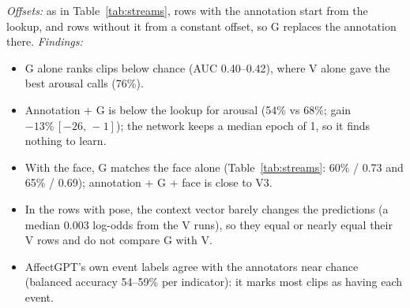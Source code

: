 \documentclass[11pt]{article}
\newcommand{\ci}[2]{\,[#1,\,#2]}
\begin{document}
\begin{table}[!htbp]
{\emph{Offsets:} as in Table~\ref{tab:streams}, rows with the annotation start from the lookup, and rows without it from a constant offset, so G replaces the annotation there.
\emph{Findings:}
\begin{itemize}
  \item G alone ranks clips below chance (AUC 0.40--0.42), where V alone gave the best arousal calls (76\%).
  \item Annotation + G is below the lookup for arousal (54\% vs 68\%; gain $-13\%\ci{-26}{-1}$); the network keeps a median epoch of 1, so it finds nothing to learn.
  \item With the face, G matches the face alone (Table~\ref{tab:streams}: 60\% / 0.73 and 65\% / 0.69); annotation + G + face is close to V3.
  \item In the rows with pose, the context vector barely changes the predictions (a median 0.003 log-odds from the V runs), so they equal or nearly equal their V rows and do not compare G with V.
  \item AffectGPT's own event labels agree with the annotators near chance (balanced accuracy 54--59\% per indicator): it marks most clips as having each event.
\end{itemize}}
\end{table}
\end{document}
